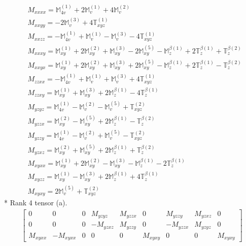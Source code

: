 \documentclass[fleqn,8pt,landscape]{jsarticle}
\begin{document}
\begin{align*}
& M_{xxxx} = \mathbb{M}_{4v}^{(1)} + 2 \mathbb{M}_{v}^{(1)} + 4 \mathbb{M}_{v}^{(2)} \\
& M_{xxyy} = - 2 \mathbb{M}_{v}^{(3)} + 4 \mathbb{T}_{xyz}^{(1)} \\
& M_{xxzz} = - \mathbb{M}_{4v}^{(1)} + \mathbb{M}_{v}^{(1)} - \mathbb{M}_{v}^{(3)} - 4 \mathbb{T}_{xyz}^{(1)} \\
& M_{xxxy} = \mathbb{M}_{xy}^{(1)} + 2 \mathbb{M}_{xy}^{(2)} + \mathbb{M}_{xy}^{(3)} - 2 \mathbb{M}_{xy}^{(5)} - \mathbb{M}_{z}^{\beta(1)} + 2 \mathbb{T}_{z}^{\beta(1)} + \mathbb{T}_{z}^{\beta(2)} \\
& M_{xxyx} = \mathbb{M}_{xy}^{(1)} + 2 \mathbb{M}_{xy}^{(2)} + \mathbb{M}_{xy}^{(3)} + 2 \mathbb{M}_{xy}^{(5)} - \mathbb{M}_{z}^{\beta(1)} + 2 \mathbb{T}_{z}^{\beta(1)} - \mathbb{T}_{z}^{\beta(2)} \\
& M_{zzxx} = - \mathbb{M}_{4v}^{(1)} + \mathbb{M}_{v}^{(1)} + \mathbb{M}_{v}^{(3)} + 4 \mathbb{T}_{xyz}^{(1)} \\
& M_{zzxy} = \mathbb{M}_{xy}^{(1)} + \mathbb{M}_{xy}^{(3)} + 2 \mathbb{M}_{z}^{\beta(1)} - 4 \mathbb{T}_{z}^{\beta(1)} \\
& M_{yzyz} = \mathbb{M}_{4v}^{(1)} - \mathbb{M}_{v}^{(2)} - \mathbb{M}_{v}^{(5)} + \mathbb{T}_{xyz}^{(2)} \\
& M_{yzzx} = \mathbb{M}_{xy}^{(2)} - \mathbb{M}_{xy}^{(5)} + 2 \mathbb{M}_{z}^{\beta(1)} - \mathbb{T}_{z}^{\beta(2)} \\
& M_{yzzy} = \mathbb{M}_{4v}^{(1)} - \mathbb{M}_{v}^{(2)} + \mathbb{M}_{v}^{(5)} - \mathbb{T}_{xyz}^{(2)} \\
& M_{yzxz} = \mathbb{M}_{xy}^{(2)} + \mathbb{M}_{xy}^{(5)} + 2 \mathbb{M}_{z}^{\beta(1)} + \mathbb{T}_{z}^{\beta(2)} \\
& M_{xyxx} = \mathbb{M}_{xy}^{(1)} + 2 \mathbb{M}_{xy}^{(2)} - \mathbb{M}_{xy}^{(3)} - \mathbb{M}_{z}^{\beta(1)} - 2 \mathbb{T}_{z}^{\beta(1)} \\
& M_{xyzz} = \mathbb{M}_{xy}^{(1)} - \mathbb{M}_{xy}^{(3)} + 2 \mathbb{M}_{z}^{\beta(1)} + 4 \mathbb{T}_{z}^{\beta(1)} \\
& M_{xyxy} = 2 \mathbb{M}_{v}^{(5)} + \mathbb{T}_{xyz}^{(2)}
\end{align*}
* Rank 4 tensor (a).
\begin{align*}
\begin{bmatrix} 0 & 0 & 0 & M_{yzyz} & M_{yzzx} & 0 & M_{yzzy} & M_{yzxz} & 0 \\ 0 & 0 & 0 & - M_{yzxz} & M_{yzzy} & 0 & - M_{yzzx} & M_{yzyz} & 0 \\ M_{xyxx} & - M_{xyxx} & 0 & 0 & 0 & M_{xyxy} & 0 & 0 & M_{xyxy} \end{bmatrix}
\end{align*}
\end{document}
